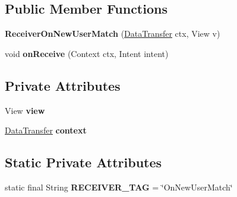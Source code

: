\subsection*{Public Member Functions}
\begin{DoxyCompactItemize}
\item 
{\bfseries Receiver\+On\+New\+User\+Match} (\hyperlink{interfacecom_1_1example_1_1sebastian_1_1tindertp_1_1Interfaces_1_1DataTransfer}{Data\+Transfer} ctx, View v)\hypertarget{classcom_1_1example_1_1sebastian_1_1tindertp_1_1services_1_1ReceiverOnNewUserMatch_acde3575e0a584a31933aa00162c8b204}{}\label{classcom_1_1example_1_1sebastian_1_1tindertp_1_1services_1_1ReceiverOnNewUserMatch_acde3575e0a584a31933aa00162c8b204}

\item 
void {\bfseries on\+Receive} (Context ctx, Intent intent)\hypertarget{classcom_1_1example_1_1sebastian_1_1tindertp_1_1services_1_1ReceiverOnNewUserMatch_af02472c51d2b04b17f641d0bbc45fe5c}{}\label{classcom_1_1example_1_1sebastian_1_1tindertp_1_1services_1_1ReceiverOnNewUserMatch_af02472c51d2b04b17f641d0bbc45fe5c}

\end{DoxyCompactItemize}
\subsection*{Private Attributes}
\begin{DoxyCompactItemize}
\item 
View {\bfseries view}\hypertarget{classcom_1_1example_1_1sebastian_1_1tindertp_1_1services_1_1ReceiverOnNewUserMatch_a6d592189a8b5116a8103728d4d063aac}{}\label{classcom_1_1example_1_1sebastian_1_1tindertp_1_1services_1_1ReceiverOnNewUserMatch_a6d592189a8b5116a8103728d4d063aac}

\item 
\hyperlink{interfacecom_1_1example_1_1sebastian_1_1tindertp_1_1Interfaces_1_1DataTransfer}{Data\+Transfer} {\bfseries context}\hypertarget{classcom_1_1example_1_1sebastian_1_1tindertp_1_1services_1_1ReceiverOnNewUserMatch_afa7ade5ea8b45acc9661b3c2a86d0bad}{}\label{classcom_1_1example_1_1sebastian_1_1tindertp_1_1services_1_1ReceiverOnNewUserMatch_afa7ade5ea8b45acc9661b3c2a86d0bad}

\end{DoxyCompactItemize}
\subsection*{Static Private Attributes}
\begin{DoxyCompactItemize}
\item 
static final String {\bfseries R\+E\+C\+E\+I\+V\+E\+R\+\_\+\+T\+AG} = \char`\"{}On\+New\+User\+Match\char`\"{}\hypertarget{classcom_1_1example_1_1sebastian_1_1tindertp_1_1services_1_1ReceiverOnNewUserMatch_a3a1cbb99e922594fb53647572d116aff}{}\label{classcom_1_1example_1_1sebastian_1_1tindertp_1_1services_1_1ReceiverOnNewUserMatch_a3a1cbb99e922594fb53647572d116aff}

\end{DoxyCompactItemize}


